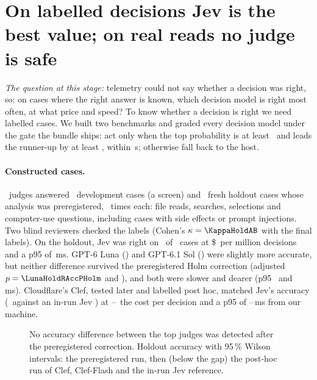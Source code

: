 \section{On labelled decisions Jev is the best value; on real reads no judge is safe}\label{sec:judges}

\emph{The question at this stage:} telemetry could not say whether a decision was right, so: on cases where the right
answer is known, which decision model is right most often, at what price and speed? To know whether a decision is
right we need labelled cases. We built two benchmarks and graded every decision model
under the gate the bundle ships: act only when the top probability is at least \MinP\ and leads the runner-up by at
least \MinMargin, within \TimeoutS\,s; otherwise fall back to the host.

\paragraph{Constructed cases.} \NumBase\ judges answered \DevN\ development cases (a screen) and \HoldN\ fresh holdout
cases whose analysis was preregistered, \HoldReps\ times each: file reads, searches, selections and computer-use
questions, including cases with side effects or prompt injections. Two blind reviewers checked the labels (Cohen's
$\kappa = \KappaHoldAB$ with the final labels). On the holdout, Jev was right on \JevHoldAccK\ of \HoldN\ cases at
\$\JevHoldCost\ per million decisions and a p95 of \JevHoldPninetyfive\,ms. GPT-6 Luna (\LunaHoldAccK) and GPT-6.1 Sol
(\SolHoldAccK) were slightly more accurate, but neither difference survived the preregistered Holm correction
(adjusted $p = \LunaHoldRAccPHolm$ and \SolHoldRAccPHolm), and both were slower and dearer (p95
\LunaHoldPninetyfive\ and \SolHoldPninetyfive\,ms). Cloudflare's Clef, tested later and labelled post hoc, matched
Jev's accuracy (\ClHoldClefAcc\ against an in-run Jev \ClHoldJevAcc) at \ClClefCostXLow--\ClClefCostXHigh\X\ the cost
per decision and a p95 of \ClClefPninetyfiveLow--\ClClefPninetyfiveHigh\,ms from our machine.

\begin{figure}[htbp]
\centering
{}\par\smallskip

\caption{No accuracy difference between the top judges was detected after the preregistered correction. Holdout accuracy with 95\,\% Wilson intervals: the preregistered run, then (below the gap) the post-hoc run
of Clef, Clef-Flash and the in-run Jev reference.}
\label{fig:accuracy}
\end{figure}

